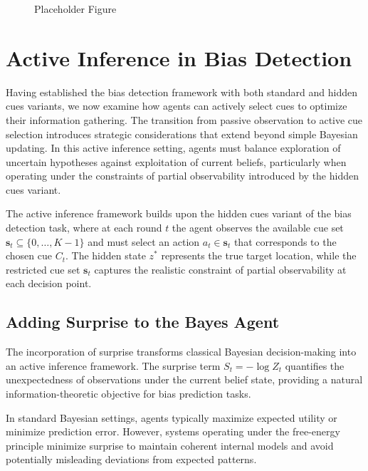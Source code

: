 \documentclass{article}
\begin{document}
\begin{figure}[h]
  \centering
  \fbox{\rule{0pt}{2in} \rule{0.9\linewidth}{0pt}}
  \caption{Placeholder Figure}
  \label{fig:placeholder}
\end{figure}



\section{Active Inference in Bias Detection}

Having established the bias detection framework with both standard and hidden cues variants, we now examine how agents can actively select cues to optimize their information gathering. The transition from passive observation to active cue selection introduces strategic considerations that extend beyond simple Bayesian updating. In this active inference setting, agents must balance exploration of uncertain hypotheses against exploitation of current beliefs, particularly when operating under the constraints of partial observability introduced by the hidden cues variant.

The active inference framework builds upon the hidden cues variant of the bias detection task, where at each round $t$ the agent observes the available cue set $\mathbf{s}_t \subseteq \{0, \ldots, K-1\}$ and must select an action $a_t \in \mathbf{s}_t$ that corresponds to the chosen cue $C_t$. The hidden state $z^*$ represents the true target location, while the restricted cue set $\mathbf{s}_t$ captures the realistic constraint of partial observability at each decision point.




\subsection{Adding Surprise to the Bayes Agent}

The incorporation of surprise transforms classical Bayesian decision-making into an active inference framework. The surprise term $S_t = -\log Z_t$ quantifies the unexpectedness of observations under the current belief state, providing a natural information-theoretic objective for bias prediction tasks.

In standard Bayesian settings, agents typically maximize expected utility or minimize prediction error. However, systems operating under the free-energy principle minimize surprise to maintain coherent internal models and avoid potentially misleading deviations from expected patterns.
\end{document}
